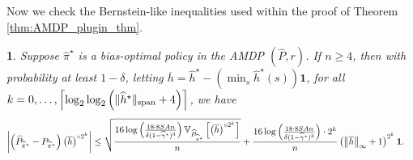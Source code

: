 \documentclass{article}
\theoremstyle{plain}
\theoremstyle{plain}
\newtheorem{lem}[thm]{\protect\lemmaname}
\theoremstyle{remark}
\theoremstyle{plain}
\theoremstyle{plain}
\providecommand{\lemmaname}{Lemma}
\newcommand{\Var}{\mathbb{V}}
\newcommand{\Phat}{\widehat{P}}
\newcommand{\pihstar}{\widehat{\pi}^\star}
\newcommand{\one}{\mathbf{1}}
\newcommand{\hc}{\overline{h}}
\newcommand{\hhat}{\widehat{h}}
\newcommand{\empbod}{\widehat{\gamma}^\star}
\begin{document}
Now we check the Bernstein-like inequalities used within the proof of Theorem \ref{thm:AMDP_plugin_thm}.
\begin{lem}
    \label{lem:LOO_AMDP_bernstein_bound_plug_in}
    Suppose $\pihstar$ is a bias-optimal policy in the AMDP $(\Phat, r)$.
    If $n \geq 4$, then with probability at least $1-\delta$, letting $\hc = \hhat^\star - \left(\min_s \hhat^{\star}(s)\right)\one$, for all $k = 0, \dots, \left\lceil\log_2 \log_2 \left( \spannorm{\hhat^{\star}} + 4\right) \right\rceil$, we have
    \begin{align*}
        \left| \left(\Phat_{\pihstar} - P_{\pihstar}\right) \left( \hc \right)^{\circ 2^k} \right|
    &\leq \sqrt{\frac{16 \log \left(\frac{18\cdot 8 SA n }{ \delta (1-\empbod)^3} \right)   \Var_{\Phat_{\pihstar}} \left[ \left(\hc \right)^{\circ 2^k}  \right]    }{n }} + \frac{ 16 \log \left(\frac{18\cdot 8 SA n }{ \delta (1-\empbod)^3} \right) \cdot 2^k }{n}  \left( \infnorm{\hc} + 1\right)^{2^k}   \one.
    \end{align*}
\end{lem}
\end{document}

